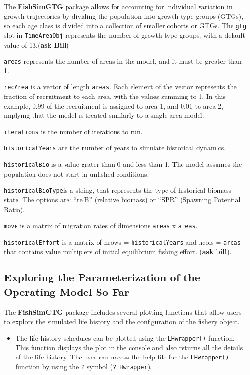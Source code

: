 \documentclass[
]{book}
\providecommand{\tightlist}{%
  \setlength{\itemsep}{0pt}\setlength{\parskip}{0pt}}
\begin{document}
The \textbf{FishSimGTG} package allows for accounting for individual variation in growth trajectories by dividing the population into growth-type groups (GTGs), so each age class is divided into a collection of smaller cohorts or GTGs. The \texttt{gtg} slot in \texttt{TimeAreaObj} represents the number of growth-type groups, with a default value of 13.(\textbf{ask Bill})

\texttt{areas} represents the number of areas in the model, and it must be greater than 1.

\texttt{recArea} is a vector of length \texttt{areas}. Each element of the vector represents the fraction of recruitment to each area, with the values summing to 1. In this example, 0.99 of the recruitment is assigned to area 1, and 0.01 to area 2, implying that the model is treated similarly to a single-area model.

\texttt{iterations} is the number of iterations to run.

\texttt{historicalYears} are the number of years to simulate historical dynamics.

\texttt{historicalBio} is a value grater than 0 and less than 1. The model assumes the population does not start in unfished conditions.

\texttt{historicalBioType}is a string, that represents the type of historical biomass state. The options are: ``relB'' (relative biomass) or ``SPR'' (Spawning Potential Ratio).

\texttt{move} is a matrix of migration rates of dimensions \texttt{areas} x \texttt{areas}.

\texttt{historicalEffort} is a matrix of nrows = \texttt{historicalYears} and ncols = \texttt{areas} that contains value multipiers of initial equilibrium fishing effort. (\textbf{ask bill}).

\subsection{Exploring the Parameterization of the Operating Model So Far}\label{lh-sel}

The \textbf{FishSimGTG} package includes several plotting functions that allow users to explore the simulated life history and the configuration of the fishery object.

\begin{itemize}
\tightlist
\item
  The life history schedules can be plotted using the \texttt{LHwrapper()} function. This function displays the plot in the console and also returns all the details of the life history. The user can access the help file for the \texttt{LHwrapper()} function by using the \texttt{?} symbol (\texttt{?LHwrapper}).
\end{itemize}
\end{document}
